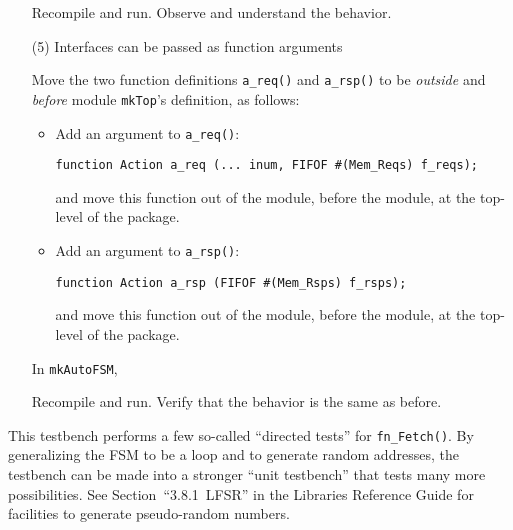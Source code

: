 \begin{itemize}
    Recompile and run.  Observe and understand the behavior.

\item[(5)] Interfaces can be passed as function arguments

    Move the two function definitions \verb|a_req()| and
    \verb|a_rsp()| to be \emph{outside} and \emph{before} module
    \verb|mkTop|'s definition, as follows:

    \begin{itemize}
    \item Add an argument to \verb|a_req()|:

          {\footnotesize
\begin{Verbatim}[frame=single]
    function Action a_req (... inum, FIFOF #(Mem_Reqs) f_reqs);
\end{Verbatim}
          }
          and move this function out of the module, before the module,
          at the top-level of the package.

    \item Add an argument to \verb|a_rsp()|:
          {\footnotesize
\begin{Verbatim}[frame=single]
    function Action a_rsp (FIFOF #(Mem_Rsps) f_rsps);
\end{Verbatim}
          }

          and move this function out of the module, before the module,
          at the top-level of the package.
    \end{itemize}

    In \verb|mkAutoFSM|,

    Recompile and run.  Verify that the behavior is the same as before.

\end{itemize}

This testbench performs a few so-called ``directed tests'' for
\verb|fn_Fetch()|.  By generalizing the FSM to be a loop and to
generate random addresses, the testbench can be made into a stronger
``unit testbench'' that tests many more possibilities.  See
Section~``3.8.1~LFSR'' in the {\bsc} Libraries Reference Guide for
facilities to generate pseudo-random numbers.

